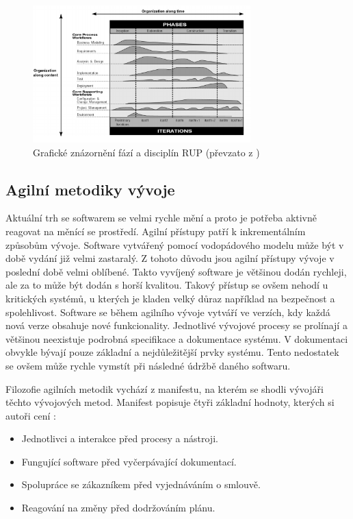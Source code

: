 \documentclass[czech,master,public,dept460,male,cpdeclaration,oneside]{diploma}
\begin{document}
\begin{figure}[!ht]
    \centering
    \includegraphics[width=0.75\textwidth]{Diplomka/Figures/rup.png}
    \caption{Grafické znázornění fází a disciplín RUP (převzato z \cite{ref:rup_ibm})}
    \label{fig:rup}
\end{figure}

\subsection{Agilní metodiky vývoje}
Aktuální trh se softwarem se velmi rychle mění a proto je potřeba aktivně reagovat na měnící se prostředí. Agilní přístupy patří k inkrementálním způsobům vývoje. Software vytvářený pomocí vodopádového modelu může být v době vydání již velmi zastaralý. Z tohoto důvodu jsou agilní přístupy vývoje v poslední době velmi oblíbené. Takto vyvíjený software je většinou dodán rychleji, ale za to může být dodán s horší kvalitou. Takový přístup se ovšem nehodí u kritických systémů, u kterých je kladen velký důraz například na bezpečnost a spolehlivost. Software se během agilního vývoje vytváří ve verzích, kdy každá nová verze obsahuje nové funkcionality. Jednotlivé vývojové procesy se prolínají a většinou neexistuje podrobná specifikace a dokumentace systému. V dokumentaci obvykle bývají pouze základní a nejdůležitější prvky systému. Tento nedostatek se ovšem může rychle vymstít při následné údržbě daného softwaru.

Filozofie agilních metodik vychází z manifestu, na kterém se shodli vývojáři těchto vývojových metod. Manifest popisuje čtyři základní hodnoty, kterých si autoři cení \cite{ref:agilne_manifesto}:

\begin{itemize}
\item Jednotlivci a interakce před procesy a nástroji.
\item Fungující software před vyčerpávající dokumentací.
\item Spolupráce se zákazníkem před vyjednáváním o smlouvě.
\item Reagování na změny před dodržováním plánu.
\end{itemize}
\end{document}
